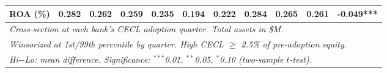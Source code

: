 \begin{tabular}{lrrr rrr rrr r}
  \hspace{1em}ROA (\%) & 0.282 & 0.262 & 0.259 & 0.235 & 0.194 & 0.222 & 0.284 & 0.265 & 0.261 & -0.049*** \\
  \midrule
  \midrule
  \multicolumn{11}{l}{\emph{Cross-section at each bank's CECL adoption quarter. Total assets in \$M.}} \\
  \multicolumn{11}{l}{\emph{Winsorized at 1st/99th percentile by quarter. High CECL $\geq$ 2.5\% of pre-adoption equity.}} \\
  \multicolumn{11}{l}{\emph{Hi$-$Lo: mean difference. Significance: $^{***}$0.01, $^{**}$0.05, $^{*}$0.10 (two-sample $t$-test).}} \\
\end{tabular}
\par\endgroup

